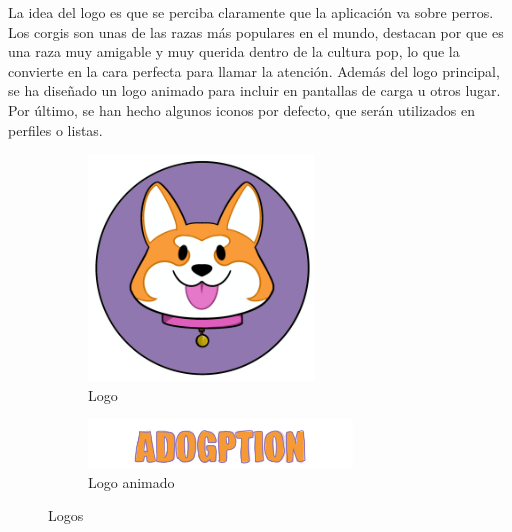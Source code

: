 \documentclass[a4paper, 12pt]{article}
\begin{document}
La idea del logo es que se perciba claramente que la aplicación va sobre perros. Los corgis son unas de las razas más populares en el mundo, destacan por que es una raza muy amigable y muy querida dentro de la cultura pop, lo que la convierte en la cara perfecta para llamar la atención. Además del logo principal, se ha diseñado un logo animado para incluir en pantallas de carga u otros lugar. Por último, se han hecho algunos iconos por defecto, que serán utilizados en perfiles o listas.


\begin{figure}[H]
   	\begin{subfigure}{0.48\textwidth}
		\begin{center}
			{\includegraphics[width=6cm]{Logo1.png}\par}
			\caption{Logo}
		\end{center}  
	\end{subfigure}\hfill
   	\begin{subfigure}{0.48\textwidth}
		\begin{center}
			{\includegraphics[width=7cm]{ADOGPTIONFIXED.png}\par}
			\caption{Logo animado}
		\end{center}  
	\end{subfigure}\hfill
	\caption{Logos}
\end{figure}
\end{document}
